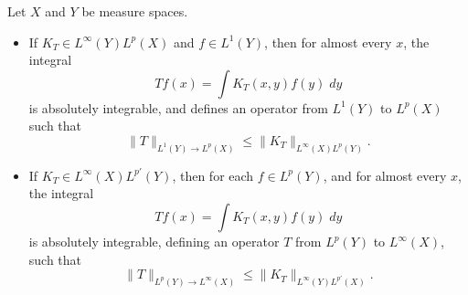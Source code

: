 \begin{theorem} \label{thm:Schurl}
    Let $X$ and $Y$ be measure spaces.
    \begin{itemize}
        \item If $K_T \in L^\infty(Y) L^p(X)$ and $f \in L^1(Y)$, then for almost every $x$, the integral
        \[ Tf(x) = \int K_T(x,y) f(y)\; dy \]
        is absolutely integrable, and defines an operator from $L^1(Y)$ to $L^p(X)$ such that
        \[ \| T \|_{L^1(Y) \to L^p(X)} \leq \| K_T \|_{L^\infty(X) L^p(Y)}. \]

        \item If $K_T \in L^\infty(X) L^{p'}(Y)$, then for each $f \in L^p(Y)$, and for almost every $x$, the integral
        \[ Tf(x) = \int K_T(x,y) f(y)\; dy \]
        is absolutely integrable, defining an operator $T$ from $L^p(Y)$ to $L^\infty(X)$, such that
        \[ \| T \|_{L^p(Y) \to L^\infty(X)} \leq \| K_T \|_{L^\infty(Y) L^{p'}(X)}. \]
    \end{itemize}
\end{theorem}
